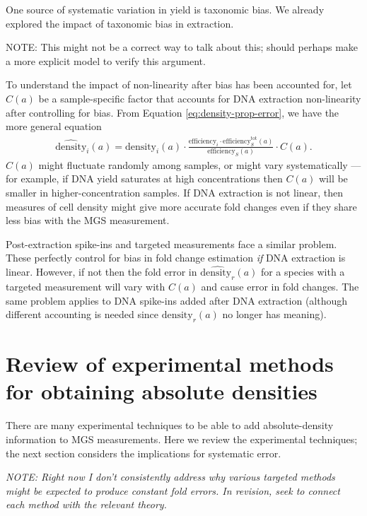 \documentclass[
]{article}
\begin{document}
One source of systematic variation in yield is taxonomic bias.
We already explored the impact of taxonomic bias in extraction.

NOTE: This might not be a correct way to talk about this; should perhaps make a more explicit model to verify this argument.

To understand the impact of non-linearity after bias has been accounted for, let \(C(a)\) be a sample-specific factor that accounts for DNA extraction non-linearity after controlling for bias.
From Equation \eqref{eq:density-prop-error}, we have the more general equation
\begin{align}
  \label{eq:density-prop-error-linearity}
  \widehat{\text{density}}_{i}(a) 
  = \text{density}_{i}(a) \cdot \frac{\text{efficiency}_{i} \cdot \text{efficiency}^{\text{tot}}_S(a)}{\text{efficiency}_S(a)} \cdot C(a).
\end{align}
\(C(a)\) might fluctuate randomly among samples, or might vary systematically --- for example, if DNA yield saturates at high concentrations then \(C(a)\) will be smaller in higher-concentration samples.
If DNA extraction is not linear, then measures of cell density might give more accurate fold changes even if they share less bias with the MGS measurement.

Post-extraction spike-ins and targeted measurements face a similar problem.
These perfectly control for bias in fold change estimation \emph{if} DNA extraction is linear.
However, if not then the fold error in \(\widehat{\text{density}_r}(a)\) for a species with a targeted measurement will vary with \(C(a)\) and cause error in fold changes.
The same problem applies to DNA spike-ins added after DNA extraction (although different accounting is needed since \(\text{density}_r(a)\) no longer has meaning).

\hypertarget{review-absolute-methods}{%
\section{Review of experimental methods for obtaining absolute densities}\label{review-absolute-methods}}

There are many experimental techniques to be able to add absolute-density information to MGS measurements.
Here we review the experimental techniques; the next section considers the implications for systematic error.

\emph{NOTE: Right now I don't consistently address why various targeted methods might be expected to produce constant fold errors. In revision, seek to connect each method with the relevant theory.}
\end{document}
